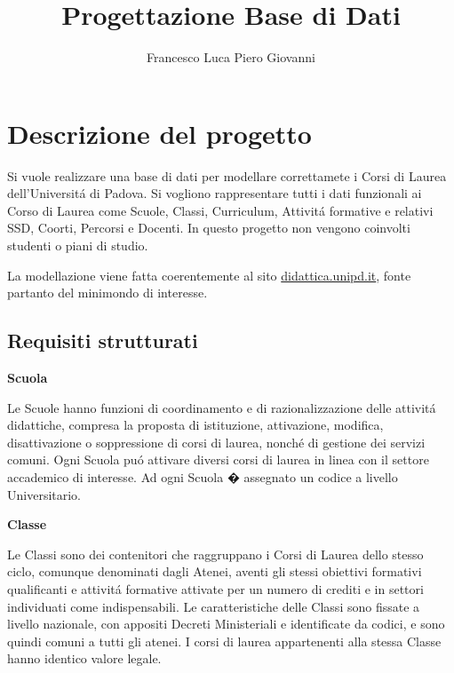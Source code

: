 \documentclass[a4paper,12pt,italian,towside]{article}
\title{Progettazione Base di Dati}
\author{Francesco Luca Piero Giovanni}
\date{}
\begin{document}
\maketitle
\newpage

\tableofcontents

\newpage
\section{Descrizione del progetto}
Si vuole realizzare una base di dati per modellare correttamete i Corsi di Laurea dell'Universit\'a di Padova.
Si vogliono rappresentare tutti i dati funzionali ai Corso di Laurea come Scuole, Classi, Curriculum, Attivit\'a formative e relativi SSD, Coorti, Percorsi e Docenti.
In questo progetto non vengono coinvolti studenti o piani di studio.
\par
La modellazione viene fatta coerentemente al sito  \href{https://didattica.unipd.it/}{didattica.unipd.it}, fonte partanto del minimondo di interesse.



\subsection{Requisiti strutturati}

\textbf{Scuola}
\par Le Scuole hanno funzioni di coordinamento e di razionalizzazione delle attivit\'a didattiche, compresa la proposta di istituzione, attivazione, modifica, disattivazione o soppressione di corsi di laurea, nonch\'e di gestione dei servizi comuni. Ogni Scuola pu\'o attivare diversi corsi di laurea in linea con il settore accademico di interesse. Ad ogni Scuola � assegnato un codice a livello Universitario.
\newline

\textbf{Classe}
\par
Le Classi sono dei contenitori che raggruppano i Corsi di Laurea dello stesso ciclo, comunque denominati dagli Atenei, aventi gli stessi obiettivi formativi qualificanti e attivit\'a formative attivate per un numero di crediti e in settori individuati come indispensabili. Le caratteristiche delle Classi sono fissate a livello nazionale, con appositi Decreti Ministeriali e identificate da codici, e sono quindi comuni a tutti gli atenei. I corsi di laurea appartenenti alla stessa Classe hanno identico valore legale.
\\
\end{document}
